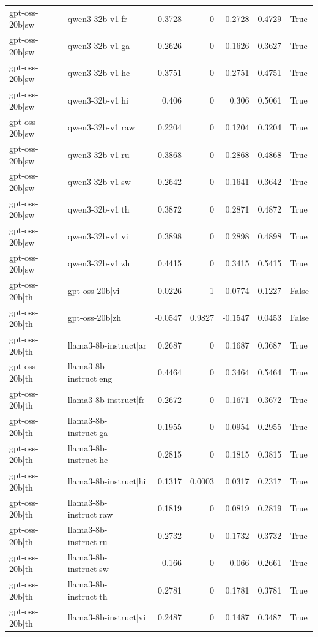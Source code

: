\begin{table}
\begin{tabular}{l l r r r r l}
gpt-oss-20b|sw & qwen3-32b-v1|fr & 0.3728 & 0 & 0.2728 & 0.4729 & True \\
gpt-oss-20b|sw & qwen3-32b-v1|ga & 0.2626 & 0 & 0.1626 & 0.3627 & True \\
gpt-oss-20b|sw & qwen3-32b-v1|he & 0.3751 & 0 & 0.2751 & 0.4751 & True \\
gpt-oss-20b|sw & qwen3-32b-v1|hi & 0.406 & 0 & 0.306 & 0.5061 & True \\
gpt-oss-20b|sw & qwen3-32b-v1|raw & 0.2204 & 0 & 0.1204 & 0.3204 & True \\
gpt-oss-20b|sw & qwen3-32b-v1|ru & 0.3868 & 0 & 0.2868 & 0.4868 & True \\
gpt-oss-20b|sw & qwen3-32b-v1|sw & 0.2642 & 0 & 0.1641 & 0.3642 & True \\
gpt-oss-20b|sw & qwen3-32b-v1|th & 0.3872 & 0 & 0.2871 & 0.4872 & True \\
gpt-oss-20b|sw & qwen3-32b-v1|vi & 0.3898 & 0 & 0.2898 & 0.4898 & True \\
gpt-oss-20b|sw & qwen3-32b-v1|zh & 0.4415 & 0 & 0.3415 & 0.5415 & True \\
gpt-oss-20b|th & gpt-oss-20b|vi & 0.0226 & 1 & -0.0774 & 0.1227 & False \\
gpt-oss-20b|th & gpt-oss-20b|zh & -0.0547 & 0.9827 & -0.1547 & 0.0453 & False \\
gpt-oss-20b|th & llama3-8b-instruct|ar & 0.2687 & 0 & 0.1687 & 0.3687 & True \\
gpt-oss-20b|th & llama3-8b-instruct|eng & 0.4464 & 0 & 0.3464 & 0.5464 & True \\
gpt-oss-20b|th & llama3-8b-instruct|fr & 0.2672 & 0 & 0.1671 & 0.3672 & True \\
gpt-oss-20b|th & llama3-8b-instruct|ga & 0.1955 & 0 & 0.0954 & 0.2955 & True \\
gpt-oss-20b|th & llama3-8b-instruct|he & 0.2815 & 0 & 0.1815 & 0.3815 & True \\
gpt-oss-20b|th & llama3-8b-instruct|hi & 0.1317 & 0.0003 & 0.0317 & 0.2317 & True \\
gpt-oss-20b|th & llama3-8b-instruct|raw & 0.1819 & 0 & 0.0819 & 0.2819 & True \\
gpt-oss-20b|th & llama3-8b-instruct|ru & 0.2732 & 0 & 0.1732 & 0.3732 & True \\
gpt-oss-20b|th & llama3-8b-instruct|sw & 0.166 & 0 & 0.066 & 0.2661 & True \\
gpt-oss-20b|th & llama3-8b-instruct|th & 0.2781 & 0 & 0.1781 & 0.3781 & True \\
gpt-oss-20b|th & llama3-8b-instruct|vi & 0.2487 & 0 & 0.1487 & 0.3487 & True \\

\end{tabular}
\end{table}
